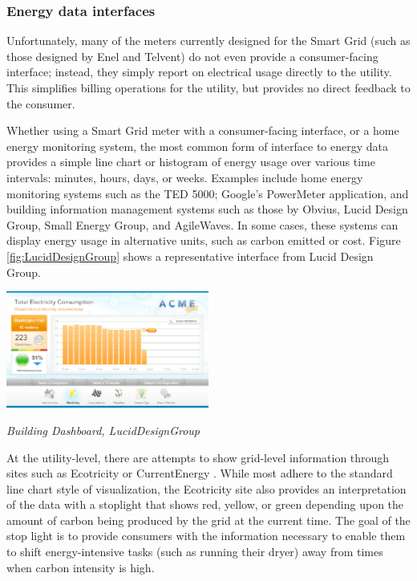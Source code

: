 \subsubsection{Energy data interfaces}

Unfortunately, many of the meters currently designed for the Smart Grid
(such as those designed by Enel and Telvent) do not even provide a
consumer-facing interface; instead, they simply report on electrical usage
directly to the utility.  This simplifies billing operations for the
utility, but provides no direct feedback to the consumer.

Whether using a Smart Grid meter with a consumer-facing interface, or a
home energy monitoring system, the most common form of interface to energy
data provides a simple line chart or histogram of energy usage over various
time intervals: minutes, hours, days, or weeks.  Examples include home
energy monitoring systems such as the TED 5000; Google's PowerMeter
application, and building information management systems such as those by
Obvius, Lucid Design Group, Small Energy Group, and AgileWaves. In some
cases, these systems can display energy usage in alternative units, such as
carbon emitted or cost.  Figure \ref{fig:LucidDesignGroup} shows a
representative interface from Lucid Design Group.

\begin{floatingfigure}[l]{3.25in}
  \center
  \includegraphics[width=0.5\textwidth]{luciddesigngroup.3.eps}
  \caption{\em \small Building Dashboard, LucidDesignGroup}
  \label{fig:LucidDesignGroup}
\end{floatingfigure} 


At the utility-level, there are attempts to show grid-level information
through sites such as Ecotricity \cite{Ecotricity} or CurrentEnergy
\cite{CurrentEnergy}.  While most adhere to the standard line chart style
of visualization, the Ecotricity site also provides an interpretation of
the data with a stoplight that shows red, yellow, or green depending upon
the amount of carbon being produced by the grid at the current time.  The
goal of the stop light is to provide consumers with the information
necessary to enable them to shift energy-intensive tasks (such as running
their dryer) away from times when carbon intensity is high.

